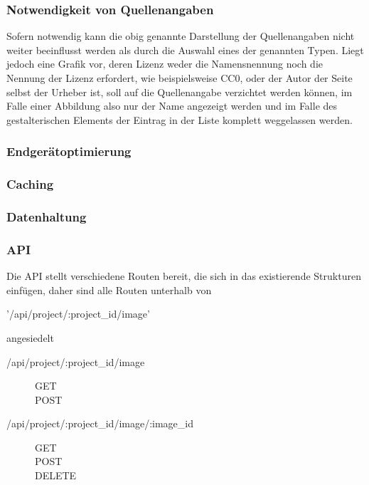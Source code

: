 \subsubsection{Notwendigkeit von Quellenangaben}

Sofern notwendig kann die obig genannte Darstellung der Quellenangaben nicht
weiter beeinflusst werden als durch die Auswahl eines der genannten Typen. Liegt
jedoch eine Grafik vor, deren Lizenz weder die Namensnennung noch die Nennung
der Lizenz erfordert, wie beispielsweise CC0, oder der Autor der Seite selbst der
Urheber ist, soll auf die Quellenangabe verzichtet werden k\"{o}nnen, im Falle
einer Abbildung also nur der Name angezeigt werden und im Falle des
gestalterischen Elements der Eintrag in der Liste komplett weggelassen werden.

\subsubsection{Endger\"{a}toptimierung}



\subsubsection{Caching}



\subsubsection{Datenhaltung}



\subsubsection{API}

Die API stellt verschiedene Routen bereit, die sich in das existierende
Strukturen einf\"{u}gen, daher sind alle Routen unterhalb von
\begin{description}
  \item ['/api/project/:project_id/image']
\end{description}
angesiedelt

\begin{description}
  \item [/api/project/:project_id/image]
    \begin{description}
    \item [GET]
    \item [POST]
    \end{description}
  \item [/api/project/:project_id/image/:image_id]
    \begin{description}
    \item [GET]
    \item[POST]
    \item[DELETE]
    \end{description}

\end{description}

